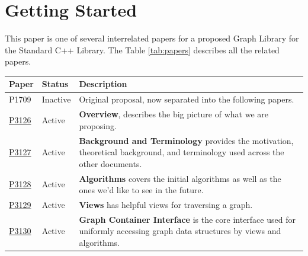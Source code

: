 
\section{Getting Started}

This paper is one of several interrelated papers for a proposed Graph Library for the Standard C++ Library. 
The Table \ref{tab:papers} describes all the related papers. 

\begin{table}[h!]
    \begin{center}
    {\begin{tabular}{l l p{14cm}}
       \hline
       \textbf{Paper}     & \textbf{Status} & \textbf{Description}                                                                                                                                                                             \\
       \hline
       P1709              & Inactive       & Original proposal, now separated into the following papers. \\
       \hdashline
       \href{https://www.wg21.link/P3126}{P3126} & Active         & \textbf{Overview}, describes the big picture of what we are proposing. \\
       \href{https://www.wg21.link/P3127}{P3127} & Active         & \textbf{Background and Terminology} provides the motivation, theoretical background, and terminology used across the other documents.\\
       \href{https://www.wg21.link/P3128}{P3128} & Active         & \textbf{Algorithms} covers the initial algorithms 
                                                                    as well as the ones we'd like to see in the future. \\
       \href{https://www.wg21.link/P3129}{P3129} & Active         & \textbf{Views} has helpful views for traversing a graph. \\
       \href{https://www.wg21.link/P3130}{P3130} & Active         & \textbf{Graph Container Interface} is the core interface used
                                                                    for uniformly accessing graph data structures by views and algorithms.

\end{tabular}}
\end{center}
\end{table}
